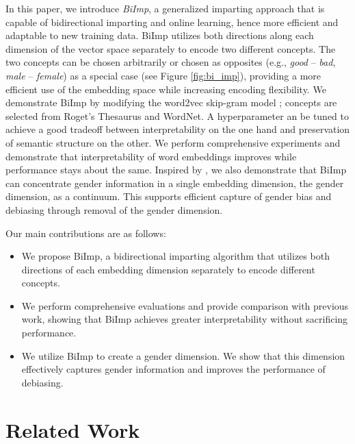 \documentclass[11pt,a4paper]{article}
\def\proposedmethod{BiImp}
\begin{document}
In this paper, we introduce \textit{\proposedmethod{}}, a generalized imparting approach that is capable of bidirectional imparting and online learning, hence more efficient and adaptable to new training data. 
\proposedmethod{} utilizes both directions along each
dimension of the vector space separately to encode two
different concepts. The two concepts  can be chosen arbitrarily or chosen as opposites (e.g., \textit{good} -- \textit{bad}, \textit{male} -- \textit{female}) as a special case (see Figure \ref{fig:bi_imp}), providing a more efficient use of the embedding space while increasing encoding flexibility. 
We demonstrate \proposedmethod{} by modifying the word2vec
skip-gram model
\citep{mikolov13word2vec_a,mikolov13word2vec_b}; concepts
are selected from Roget's Thesaurus and WordNet.
A hyperparameter an be tuned to achieve a good tradeoff
between interpretability on the one hand and
preservation of semantic structure on the other.
We perform comprehensive experiments  and demonstrate that
interpretability of word embeddings improves while
performance stays about the same.
Inspired by  \citet{bolukbasi16debiasing}, we also
demonstrate that \proposedmethod{} can concentrate gender
information in a single embedding dimension, the gender dimension, as a continuum. 
This supports efficient capture of gender bias 
and debiasing through removal of the gender dimension.

Our main contributions are as follows:
\begin{itemize}
    \item We propose \proposedmethod{}, a bidirectional imparting algorithm that utilizes both directions of each embedding dimension separately to encode different concepts.
    
    \item We perform comprehensive evaluations and provide comparison with  previous work, showing that \proposedmethod{} achieves greater interpretability  without sacrificing performance. 
    
    \item We utilize \proposedmethod{} to create a gender dimension. We show that this dimension effectively captures gender information and improves the performance of debiasing.
\end{itemize}

\section{Related Work} \label{sec:related}
\end{document}
